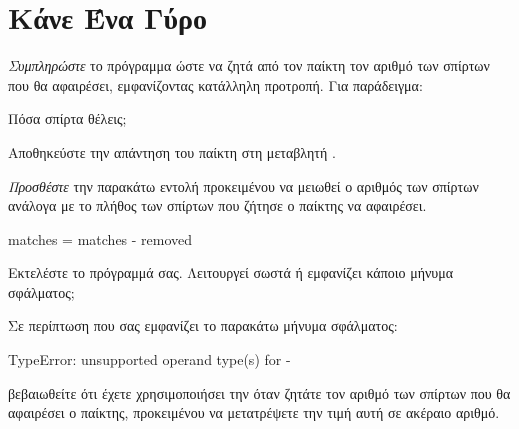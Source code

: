 \documentclass[a4paper,11pt,oneside]{book}
\begin{document}
\section{Κάνε Ένα Γύρο}
\begin{step}
\label{step:ask-matches}
\emph{Συμπληρώστε} το πρόγραμμα ώστε να ζητά από τον παίκτη τον αριθμό των σπίρτων που θα αφαιρέσει, εμφανίζοντας κατάλληλη προτροπή. Για παράδειγμα:

\marginnote[14pt]{\iconcomputer}
\begin{pyterm}
Πόσα σπίρτα θέλεις;
\end{pyterm}

Αποθηκεύστε την απάντηση του παίκτη στη μεταβλητή .
\end{step}


\begin{step}
\label{step:matches-reduce}

\emph{Προσθέστε} την παρακάτω εντολή προκειμένου να μειωθεί ο αριθμός των σπίρτων  ανάλογα με το πλήθος των σπίρτων  που ζήτησε ο παίκτης να αφαιρέσει.

\begin{pynew}
    matches = matches - removed
\end{pynew}

Εκτελέστε το πρόγραμμά σας. Λειτουργεί σωστά ή εμφανίζει κάποιο μήνυμα σφάλματος; 

\marginnote[14pt]{\icondiscuss}
\dottedline

\marginnote{\iconcaution}
Σε περίπτωση που σας εμφανίζει το παρακάτω μήνυμα σφάλματος: 

\begin{pyterm}
TypeError: unsupported operand type(s) for -
\end{pyterm}

βεβαιωθείτε ότι έχετε χρησιμοποιήσει την  όταν ζητάτε τον αριθμό των σπίρτων που θα αφαιρέσει ο παίκτης, προκειμένου να μετατρέψετε την τιμή αυτή σε ακέραιο αριθμό.
\end{step}
\end{document}
